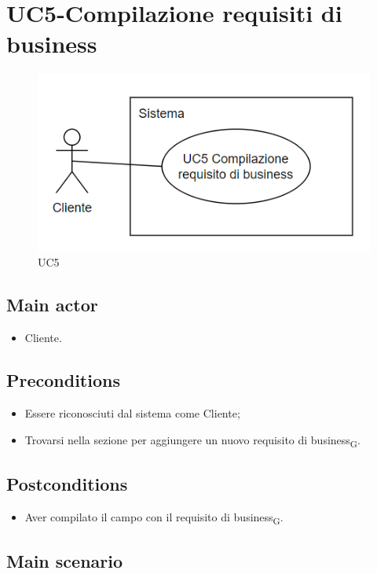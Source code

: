 \documentclass{article}
\begin{document}
\section{UC5-Compilazione requisiti di business}
    \begin{figure}[H]
      \centering
      \includegraphics[width=.8\textwidth, height=.6\textheight, keepaspectratio]{./imgUML/UC5-COMPILAZIONE-REQUISITO-DI-BUSINESS.png}
            \caption{UC5}
      \label{fig:UC5}
    \end{figure}
     \subsection*{Main actor}
     \begin{itemize}
         \item Cliente.
     \end{itemize}
     \subsection*{Preconditions} 
     \begin{itemize}
         \item Essere riconosciuti dal sistema come Cliente;
         \item Trovarsi nella sezione per aggiungere un nuovo requisito di business\textsubscript{G}.
     \end{itemize}
     \subsection*{Postconditions} 
        \begin{itemize}
         \item Aver compilato il campo con il requisito di business\textsubscript{G}.
        \end{itemize}
        
     \subsection*{Main scenario}
\end{document}
